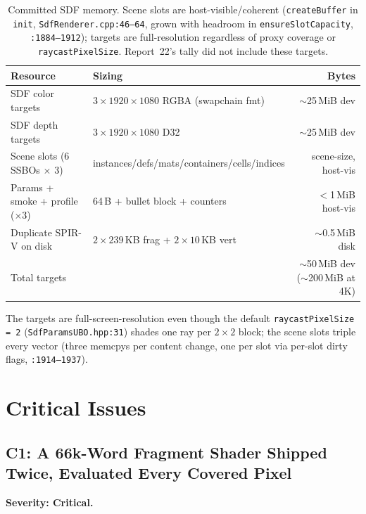 \documentclass[11pt,a4paper]{article}
\begin{document}
\begin{table}[h]
\centering
\small
\begin{tabular}{@{}p{5.9cm}p{4.3cm}r@{}}
\toprule
\textbf{Resource} & \textbf{Sizing} & \textbf{Bytes} \\
\midrule
SDF color targets & $3 \times 1920\times1080$ RGBA (swapchain fmt) & $\sim$25\,MiB dev \\
SDF depth targets & $3 \times 1920\times1080$ D32 & $\sim$25\,MiB dev \\
Scene slots (6 SSBOs $\times$ 3) & instances/defs/mats/containers/cells/indices & scene-size, host-vis \\
Params + smoke + profile ($\times$3) & 64\,B + bullet block + counters & $<$1\,MiB host-vis \\
Duplicate SPIR-V on disk & $2 \times 239$\,KB frag + $2 \times 10$\,KB vert & $\sim$0.5\,MiB disk \\
\midrule
Total targets & & $\sim$50\,MiB dev ($\sim$200\,MiB at 4K) \\
\bottomrule
\end{tabular}
\caption{Committed SDF memory. Scene slots are host-visible/coherent
(\texttt{createBuffer} in \texttt{init}, \texttt{SdfRenderer.cpp:46--64},
grown with headroom in \texttt{ensureSlotCapacity}, \texttt{:1884--1912});
targets are full-resolution regardless of proxy coverage or
\texttt{raycastPixelSize}. Report~22's tally did not include these targets.}
\end{table}

The targets are full-screen-resolution even though the default
\texttt{raycastPixelSize = 2} (\texttt{SdfParamsUBO.hpp:31}) shades one ray
per $2\times2$ block; the scene slots triple every vector (three memcpys per
content change, one per slot via per-slot dirty flags, \texttt{:1914--1937}).

\section{Critical Issues}

\subsection{C1: A 66k-Word Fragment Shader Shipped Twice, Evaluated Every Covered Pixel}
\label{sec:c1}

\textbf{Severity: Critical.}
\end{document}
